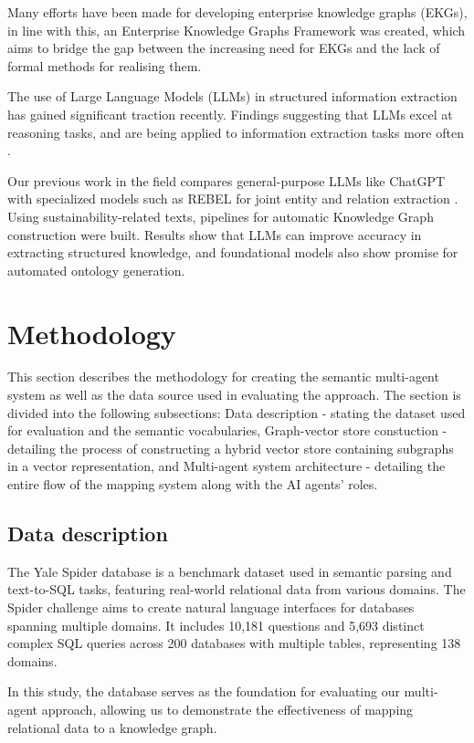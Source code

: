 \documentclass[runningheads]{llncs}
\begin{document}
Many efforts have been made for developing enterprise knowledge graphs (EKGs), in line with this, an Enterprise Knowledge Graphs Framework \cite{galkin2016integration} was created, which aims to bridge the gap between the increasing need for EKGs and the lack of formal methods for realising them. 

The use of Large Language Models (LLMs) in structured information extraction has gained significant traction recently. Findings suggesting that LLMs excel at reasoning tasks, and are being applied to information extraction tasks more often \cite{xu2024large}. 

Our previous work in the field compares general-purpose LLMs like ChatGPT with specialized models such as REBEL for joint entity and relation extraction \cite{trajanoska2023enhancing}. Using sustainability-related texts, pipelines for automatic Knowledge Graph construction were built. Results show that LLMs can improve accuracy in extracting structured knowledge, and foundational models also show promise for automated ontology generation.

\section{Methodology}
This section describes the methodology for creating the semantic multi-agent system as well as the data source used in evaluating the approach. The section is divided into the following subsections: Data description - stating the dataset used for evaluation and the semantic vocabularies, Graph-vector store constuction -  detailing the process of constructing a hybrid vector store containing subgraphs in a vector representation, and Multi-agent system architecture - detailing the entire flow of the mapping system along with the AI agents' roles.

\subsection{Data description}

The Yale Spider database\cite{yu2018spider} is a benchmark dataset used in semantic parsing and text-to-SQL tasks, featuring real-world relational data from various domains. The Spider challenge aims to create natural language interfaces for databases spanning multiple domains. It includes 10,181 questions and 5,693 distinct complex SQL queries across 200 databases with multiple tables, representing 138 domains. 

In this study, the database serves as the foundation for evaluating our multi-agent approach, allowing us to demonstrate the effectiveness of mapping relational data to a knowledge graph.
\end{document}
